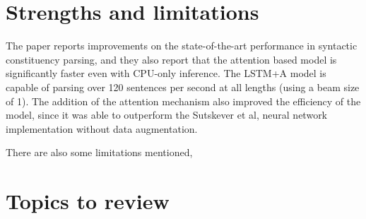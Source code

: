 \documentclass[
10pt, %
a4paper, %
oneside, %
headinclude,footinclude, %
BCOR5mm, %
]{scrartcl}
\begin{document}
\section{Strengths and limitations}

The paper reports improvements on the state-of-the-art performance in syntactic constituency parsing, and they also report that the attention based model is significantly faster even with CPU-only inference. The LSTM+A model is capable of parsing over 120 sentences per second at all lengths (using a beam size of 1). The addition of the attention mechanism also improved the efficiency of the model, since it was able to outperform the Sutskever et al, neural network implementation without data augmentation.

There are also some limitations mentioned, 

\section{Topics to review}


\renewcommand{\refname}{\spacedlowsmallcaps{References}} %




\end{document}

